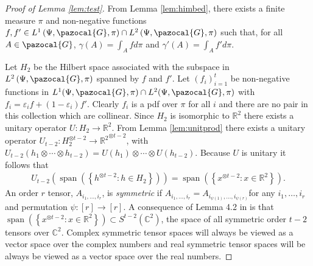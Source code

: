 \documentclass[aos,preprint]{imsart}
\def\rn{\mathbb{R}}
\def\cn{\mathbb{C}}
\def\l{\left}
\def\r{\right}
\def\sG{\pazocal{G}}
\def\spn{\operatorname{span}}
\theoremstyle{plain}
\theoremstyle{defintion}
\begin{document}
	\begin{proof}[Proof of Lemma \ref{lem:test}]
		From Lemma \ref{lem:himbed}, there exists a finite measure $\pi$ and non-negative functions $f,f' \in L^1\left( \Psi,\sG,\pi \right)\cap L^2\left( \Psi,\sG,\pi \right)$ such that, for all $A \in \sG$, $\gamma\left( A \right) = \int_A f d\pi$ and $\gamma'\left( A \right) = \int_A f' d\pi$.

		Let $H_2$ be the Hilbert space associated with the subspace in $L^2\left( \Psi,\sG,\pi \right)$ spanned by $f$ and $f'$. Let $\left( f_i \right)_{i=1}^{t}$ be non-negative functions in $L^1(\Psi, \sG, \pi)\cap L^2(\Psi, \sG, \pi)$ with $f_i = \varepsilon_i f + \left( 1-\varepsilon_i \right)f'$. Clearly $f_i$ is a pdf over $\pi$ for all $i$ and there are no pair in this collection which are collinear. Since $H_2$ is isomorphic to $\rn^2$ there exists a unitary operator $U:H_2 \to \rn^2$. From Lemma \ref{lem:unitprod} there exists a unitary operator $U_{t-2}:H_2^{\otimes t-2} \to {\rn^2}^{\otimes t-2}$, with $U_{t-2}\left( h_1 \otimes\cdots \otimes h_{t-2} \right) = U(h_1) \otimes \cdots \otimes U(h_{t-2})$. Because $U$ is unitary it follows that 
		\begin{align*}
			U_{t-2}\left( \spn\left( \left\{ h^{\otimes t-2}: h \in H_2 \right\} \right) \right) = \spn\left(\l\{ x^{\otimes t-2}:x \in \rn^2 \r\}\right).
		\end{align*}
		An order $r$ tensor, $A_{i_1,\ldots,i_r}$, is {\it symmetric} if $A_{i_1,\ldots,i_r} = A_{i_{\psi\left( 1 \right)},\ldots,i_{\psi\left( r \right)}}$for any $i_1,\ldots, i_r$ and permutation $\psi:\left[ r \right]\to \left[ r \right]$. A consequence of Lemma 4.2 in \cite{symtensorrank} is that $\spn\left( \l\{x^{\otimes t-2}:x \in \rn^2\r\} \right)\subset S^{ t-2}(\cn^2)$, the space of all symmetric order $t-2$ tensors over $\cn^2$. Complex symmetric tensor spaces will always be viewed as a vector space over the complex numbers and real symmetric tensor spaces will be always be viewed as a vector space over the real numbers.


\end{proof}
\end{document}
